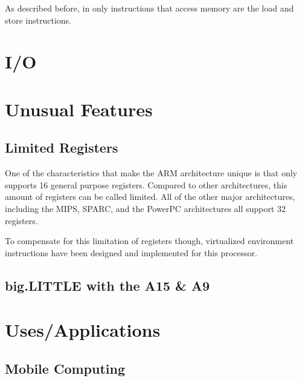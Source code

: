 \documentclass[12pt]{scrreprt}
\begin{document}
	As described before, in \iffalse Gotta put reference here \fi only instructions that access memory are the load and store instructions.

{\let\clearpage\relax\chapter{I/O}}

{\let\clearpage\relax\chapter{Unusual Features}}
	
	\section{Limited Registers}

	One of the characteristics that make the ARM architecture unique is that only supports 16 general purpose registers. Compared to other architectures, this amount of registers can be called limited. All of the other major architectures, including the MIPS, SPARC, and the PowerPC architectures all support 32 registers. \iffalse Find a way to say how Itanium has 128 registers. the Itanium RISC architecture supports 128 registers! \fi

	To compensate for this limitation of registers though, virtualized environment instructions have been designed and implemented for this 
	processor.

	\section{big.LITTLE with the A15 \& A9}

\chapter{Uses/Applications}

	\section{Mobile Computing}
\end{document}
